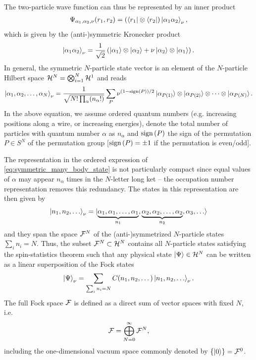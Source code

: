 The two-particle wave function can thus be represented by an inner product
\begin{align}
    \Psi_{\alpha_1,\alpha_2,\nu}(r_1,r_2) = \left(\bra{r_1}\otimes\bra{r_2}\right)\ket{\alpha_1 \alpha_2}_\nu,
\end{align}
which is given by the (anti-)symmetric Kronecker product
\begin{align}
    \ket{\alpha_1 \alpha_2}_\nu = \frac1{\sqrt2}\left(\ket{\alpha_1}\otimes\ket{\alpha_2} + \nu\ket{\alpha_2}\otimes\ket{\alpha_1}\right).
\end{align}
In general, the symmetric $N$-particle state vector is an element of the $N$-particle Hilbert space $\mathcal{H}^N = \bigotimes_{i=1}^N\mathcal{H}^1$ and reads
\begin{align}
    \ket{\alpha_1,\alpha_2,\dots,\alpha_N}_\nu = \frac1{\sqrt{N!\prod_{\alpha}(n_\alpha!)}}\sum_P \nu^{(1-\text{sign}\left( P \right))/2}\ket{\alpha_{P(1)}}\otimes\ket{\alpha_{P(2)}}\otimes\dots\otimes\ket{\alpha_{P(N)}}.
    \label{eq:symmetric_many_body_state}
\end{align}
In the above equation, we assume ordered quantum numbers (e.g. increasing positions along a wire, or increasing energies), denote the total number of particles with quantum number $\alpha$ as $n_\alpha$ and $\text{sign}\left( P \right)$ the sign of the permutation $P\in S^N$ of the permutation group [$\text{sign}\left( P \right)=\pm1$ if the permutation is even/odd].

The representation in the ordered expression of \cref{eq:symmetric_many_body_state} is not particularly compact since equal values of $\alpha$ may appear $n_\alpha$ times in the $N$-letter long ket -- the occupation number representation removes this redundancy.
The states in this representation are then given by
\begin{align}
    \ket{n_1, n_2, \dots}_\nu = \ket{\underbrace{\alpha_1,\alpha_1,\dots,\alpha_1}_{n_1}, \underbrace{\alpha_2, \alpha_2,\dots, \alpha_2}_{n_2}, \alpha_3, \dots}
\end{align}
and they span the space $\mathcal{F}^N$ of the (anti-)symmetrized $N$-particle states $\sum_{i} n_i = N$.
Thus, the subset $\mathcal{F}^N\subset \mathcal{H}^N$ contains all $N$-particle states satisfying the spin-statistics theorem such that any physical state $\ket{\Psi}\in\mathcal{H}^N$ can be written as a linear superposition of the Fock states
\begin{align}
    \ket{\Psi}_\nu = \sum_{\sum_i n_i = N}C(n_1,n_2,\dots)\ket{n_1,n_2,\dots}_\nu.
\end{align}
The full Fock space $\mathcal{F}$ is defined as a direct sum of vector spaces with fixed $N$, i.e.
\begin{align}
    \mathcal{F} = \bigoplus_{N=0}^\infty \mathcal{F}^N,
\end{align}
including the one-dimensional vacuum space commonly denoted by $\{\ket{0}\}=\mathcal{F}^0$.

